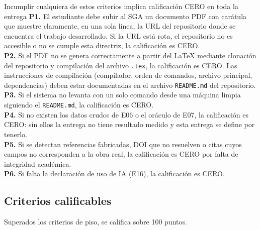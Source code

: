 \documentclass[11pt,a4paper]{article}
\begin{document}
\begin{alerta}{Incumplir cualquiera de estos criterios implica calificación CERO en toda la entrega}
	\textbf{P1.} El estudiante debe subir al SGA un documento PDF con carátula que muestre claramente, en una sola línea, la URL del repositorio donde se encuentra el trabajo desarrollado. Si la URL está rota, el repositorio no es accesible o no se cumple esta directriz, la calificación es CERO.\\[6pt]
	\textbf{P2.} Si el PDF no se genera correctamente a partir del LaTeX mediante clonación del repositorio y compilación del archivo \texttt{.tex}, la calificación es CERO. Las instrucciones de compilación (compilador, orden de comandos, archivo principal, dependencias) deben estar documentadas en el archivo \texttt{README.md} del repositorio.\\[6pt]
	\textbf{P3.} Si el sistema no levanta con un solo comando desde una máquina limpia siguiendo el \texttt{README.md}, la calificación es CERO.\\[6pt]
	\textbf{P4.} Si no existen los datos crudos de E06 o el oráculo de E07, la calificación es CERO: sin ellos la entrega no tiene resultado medido y esta entrega se define por tenerlo.\\[6pt]
	\textbf{P5.} Si se detectan referencias fabricadas, DOI que no resuelven o citas cuyos campos no corresponden a la obra real, la calificación es CERO por falta de integridad académica.\\[6pt]
	\textbf{P6.} Si falta la declaración de uso de IA (E16), la calificación es CERO.
\end{alerta}

\subsection{Criterios calificables}

Superados los criterios de piso, se califica sobre 100 puntos.
\end{document}
